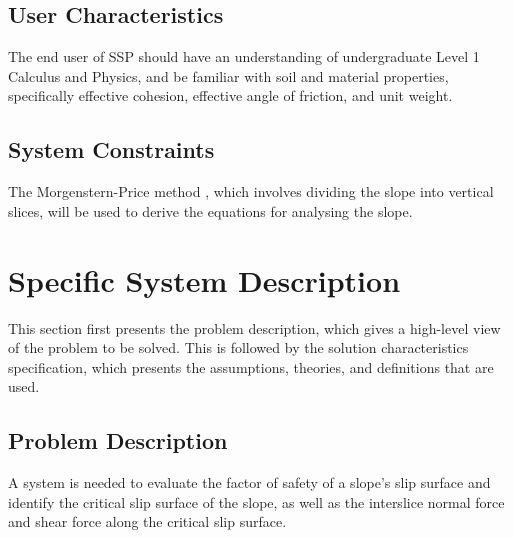 \documentclass[12pt]{article}
\begin{document}
\subsection{User Characteristics}
\label{Sec:UserChars}
The end user of SSP should have an understanding of undergraduate Level 1 Calculus and Physics, and be familiar with soil and material properties, specifically effective cohesion, effective angle of friction, and unit weight.
\subsection{System Constraints}
\label{Sec:SysConstraints}
The Morgenstern-Price method \cite{morgenstern1965}, which involves dividing the slope into vertical slices, will be used to derive the equations for analysing the slope.
\section{Specific System Description}
\label{Sec:SpecSystDesc}
This section first presents the problem description, which gives a high-level view of the problem to be solved. This is followed by the solution characteristics specification, which presents the assumptions, theories, and definitions that are used.
\subsection{Problem Description}
\label{Sec:ProbDesc}
A system is needed to evaluate the factor of safety of a slope's slip surface and identify the critical slip surface of the slope, as well as the interslice normal force and shear force along the critical slip surface.
\end{document}

